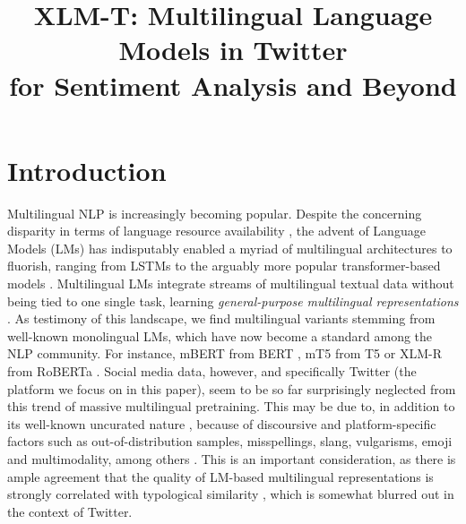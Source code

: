 \documentclass[10pt, a4paper]{article}
\title{XLM-T: Multilingual Language Models in Twitter \\ for Sentiment Analysis and Beyond}
\begin{document}
\maketitleabstract

\section{Introduction}

Multilingual NLP is increasingly becoming popular. Despite the concerning disparity in terms of language resource availability \cite{joshi-etal-2020-state}, the advent of Language Models (LMs) has indisputably enabled a myriad of multilingual architectures to fluorish, ranging from LSTMs to the arguably more popular transformer-based models \cite{chronopoulou2019embarrassingly,pires2019multilingual}. Multilingual LMs integrate streams of multilingual textual data without being tied to one single task, learning \textit{general-purpose multilingual representations} \cite{hu2020xtreme}. As testimony of this landscape, we find multilingual variants stemming from well-known monolingual LMs, which have now become a standard among the NLP community. For instance, mBERT from BERT \cite{devlin-etal-2019-bert}, mT5 \cite{xue2020mt5} from T5 \cite{raffel2020exploring} or XLM-R \cite{conneau-etal-2020-unsupervised} from RoBERTa \cite{liu2019roberta}. Social media data, however, and specifically Twitter (the platform we focus on in this paper), seem to be so far surprisingly neglected from this trend of massive multilingual pretraining. This may be due to, in addition to its well-known uncurated nature \cite{derczynski2013twitter}, because of discoursive and platform-specific factors such as out-of-distribution samples, misspellings, slang, vulgarisms, emoji and multimodality, among others \cite{barbieri2018semeval,camacho2020learning}. This is an important consideration, as there is ample agreement that the quality of LM-based multilingual representations is strongly correlated with typological similarity \cite{hu2020xtreme}, which is somewhat blurred out in the context of Twitter. 
\end{document}
